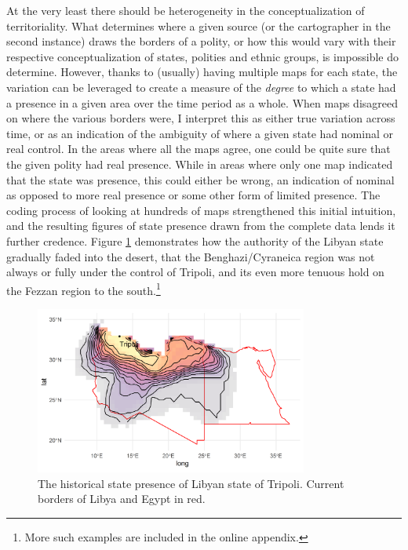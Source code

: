 \documentclass[12pt]{article}
\begin{document}
At the very least there should be heterogeneity in the conceptualization of
territoriality. What determines where a given source (or the cartographer in the
second instance) draws the borders of a polity, or how this would vary with
their respective conceptualization of states, polities and ethnic groups, is
impossible do determine. However, thanks to (usually) having multiple maps for
each state, the variation can be leveraged to create a measure of the
\textit{degree} to which a state had a presence in a given area over the time
period as a whole. When maps disagreed on where the various borders were, I
interpret this as either true variation across time, or as an indication of the
ambiguity of where a given state had nominal or real control. In the areas where
all the maps agree, one could be quite sure that the given polity had real
presence.  While in areas where only one map indicated that the state was
presence, this could either be wrong, an indication of nominal as opposed to
more real presence or some other form of limited presence. The coding process of
looking at hundreds of maps strengthened this initial intuition, and the
resulting figures of state presence drawn from the complete data lends it
further credence. Figure \ref{libya} demonstrates how the authority of the
Libyan state gradually faded into the desert, that the Benghazi/Cyraneica region
was not always or fully under the control of Tripoli, and its even more tenuous
hold on the Fezzan region to the south.\footnote{More such examples are included
in the online appendix.}


\begin{figure}[htpb]
	\centering
	\includegraphics[width=0.8\textwidth,keepaspectratio]{img/libya.png}
	\caption{The historical state presence of Libyan state of Tripoli.
	Current borders of Libya and Egypt in red.}
	\label{libya}
\end{figure}
\end{document}

